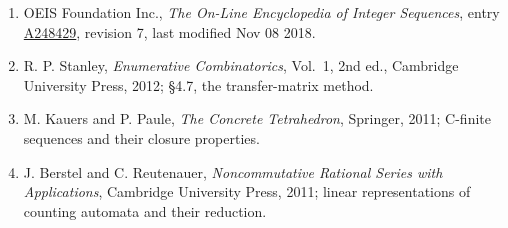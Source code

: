\documentclass[11pt]{article}
\theoremstyle{definition}
\begin{document}
\begin{enumerate}

\item OEIS Foundation Inc., \emph{The On-Line Encyclopedia of Integer Sequences}, entry \href{https://oeis.org/A248429}{A248429}, revision 7, last modified Nov 08 2018.

\item R. P. Stanley, \emph{Enumerative Combinatorics}, Vol.~1, 2nd ed., Cambridge University Press, 2012; \S4.7, the transfer-matrix method.

\item M. Kauers and P. Paule, \emph{The Concrete Tetrahedron}, Springer, 2011; C-finite sequences and their closure properties.

\item J. Berstel and C. Reutenauer, \emph{Noncommutative Rational Series with Applications}, Cambridge University Press, 2011; linear representations of counting automata and their reduction.

\end{enumerate}
\end{document}
